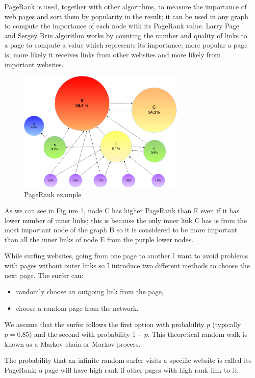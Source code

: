 \documentclass[]{usiinfbachelorproject}
\begin{document}
PageRank is used, together with other algorithms, to measure the importance of web pages and sort them by popularity in the result; it can be used in any graph to compute the importance of each node with its PageRank value. Larry Page and  Sergey Brin algorithm works by counting the number and quality of links to a page to compute a value which represents its importance; more popular a page is, more likely it receives links from other websites and more likely from important websites.

\begin{figure}[ht]
	\centering
	\includegraphics[height=6cm]{img/page_rank_example.png}
	\caption{PageRank example}
	\label{fig:prexample}
\end{figure}

As we can see in Fig ure \ref{fig:prexample}, node C has higher PageRank than E even if it has lower number of inner links; this is because the only inner link C has is from the most important node of the graph B so it is considered to be more important than all the inner links of node E from the purple lower nodes.

While surfing websites, going from one page to another I want to avoid problems with pages without outer links so I introduce two different methods to choose the next page. The surfer can:
\begin{itemize}
\item randomly choose an outgoing link from the page,
\item choose a random page from the network.
\end{itemize}
We assume that the surfer follows the first option with probability $p$ (typically $p=0.85$) and the second with probability $1-p$. This theoretical random walk is known as a Markov chain or Markov process.

The probability that an infinite random surfer visits a specific website is called its PageRank; a page will have high rank if other pages with high rank link to it.
\end{document}
